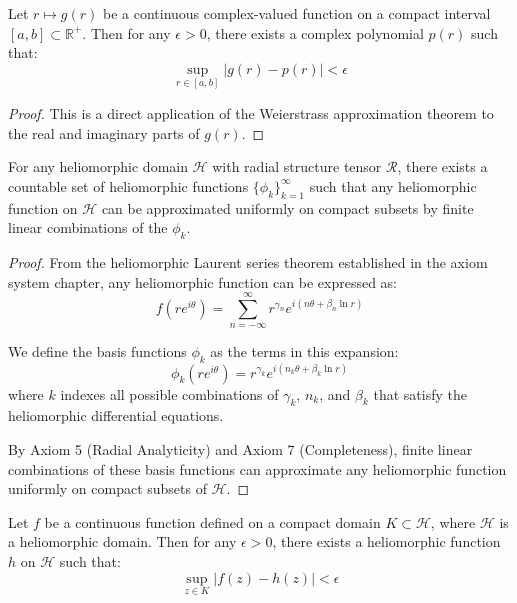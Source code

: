 \begin{lemma}
Let $r \mapsto g(r)$ be a continuous complex-valued function on a compact interval $[a, b] \subset \mathbb{R}^+$. Then for any $\epsilon > 0$, there exists a complex polynomial $p(r)$ such that:
\begin{equation}
\sup_{r \in [a, b]} |g(r) - p(r)| < \epsilon
\end{equation}
\end{lemma}

\begin{proof}
This is a direct application of the Weierstrass approximation theorem to the real and imaginary parts of $g(r)$.
\end{proof}

\begin{lemma}
For any heliomorphic domain $\mathcal{H}$ with radial structure tensor $\mathcal{R}$, there exists a countable set of heliomorphic functions $\{\phi_k\}_{k=1}^{\infty}$ such that any heliomorphic function on $\mathcal{H}$ can be approximated uniformly on compact subsets by finite linear combinations of the $\phi_k$.
\end{lemma}

\begin{proof}
From the heliomorphic Laurent series theorem established in the axiom system chapter, any heliomorphic function can be expressed as:
\begin{equation}
f(re^{i\theta}) = \sum_{n=-\infty}^{\infty} r^{\gamma_n} e^{i(n\theta + \beta_n \ln r)}
\end{equation}

We define the basis functions $\phi_k$ as the terms in this expansion:
\begin{equation}
\phi_k(re^{i\theta}) = r^{\gamma_k} e^{i(n_k\theta + \beta_k \ln r)}
\end{equation}
where $k$ indexes all possible combinations of $\gamma_k$, $n_k$, and $\beta_k$ that satisfy the heliomorphic differential equations.

By Axiom 5 (Radial Analyticity) and Axiom 7 (Completeness), finite linear combinations of these basis functions can approximate any heliomorphic function uniformly on compact subsets of $\mathcal{H}$.
\end{proof}

\begin{lemma}
Let $f$ be a continuous function defined on a compact domain $K \subset \mathcal{H}$, where $\mathcal{H}$ is a heliomorphic domain. Then for any $\epsilon > 0$, there exists a heliomorphic function $h$ on $\mathcal{H}$ such that:
\begin{equation}
\sup_{z \in K} |f(z) - h(z)| < \epsilon
\end{equation}
\end{lemma}

